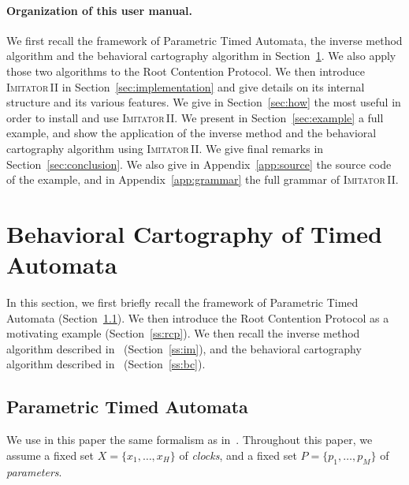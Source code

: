 \documentclass[a4paper,10pt]{article}
\newcommand{\imitatordeux}{\textsc{Imitator}\,II}
\newcommand{\paragraphe}[1]{\paragraph{#1.}}
\begin{document}
\paragraphe{Organization of this user manual}
We first recall the framework of Parametric Timed Automata,
the inverse method algorithm and
the behavioral cartography algorithm in Section~\ref{sec:preliminaries}.
We also apply those two algorithms to the Root Contention Protocol.
We then introduce \imitatordeux{} in Section~\ref{sec:implementation} and give details on its internal structure and its various features.
We give in Section~\ref{sec:how} the most useful in order to install and use \imitatordeux{}.
We present in Section~\ref{sec:example} a full example, and show the application of the inverse method and the behavioral cartography algorithm using \imitatordeux{}.
We give final remarks in Section~\ref{sec:conclusion}.
We also give in Appendix~\ref{app:source} the source code of the example, and in Appendix~\ref{app:grammar} the full grammar of \imitatordeux{}.



\section{Behavioral Cartography of Timed Automata} \label{sec:preliminaries}

In this section, we first briefly recall the framework of Parametric Timed Automata (Section~\ref{ss:pta}).
We then introduce the Root Contention Protocol as a motivating example (Section~\ref{ss:rcp}).
We then recall the inverse method algorithm described in~\cite{acef09} (Section~\ref{ss:im}), and
the behavioral cartography algorithm described in~\cite{af10} (Section~\ref{ss:bc}).



\subsection{Parametric Timed Automata} \label{ss:pta}

We use in this paper the same formalism as in~\cite{af10}.
Throughout this paper, we assume a fixed set $X = \{x_1, \dots, x_{H} \}$ of \emph{clocks},
and a fixed set $P = \{p_1, \dots, p_{M} \}$  of \emph{parameters}.
\end{document}
